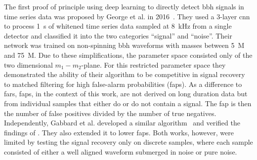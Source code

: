 The first proof of principle using deep learning to directly detect \acrshort{bbh} signals in time series data was proposed by George et al. in 2016~\cite{George:2016hay}. They used a 3-layer \acrshort{cnn} to process \SI{1}{\second} of whitened time series data sampled at \SI{8}{\kilo\hertz} from a single detector and classified it into the two categories ``signal'' and ``noise''. Their network was trained on non-spinning \acrshort{bbh} waveforms with masses between \SI{5}{M_\odot} and \SI{75}{M_\odot}. Due to these simplifications, the parameter space consisted only of the two dimensional $m_1-m_2$-plane. For this restricted parameter space they demonstrated the ability of their algorithm to be competitive in signal recovery to matched filtering for high false-alarm probabilities (\acrshort{fap}s). As a difference to \acrshort{far}s, \acrshort{fap}s, in the context of this work, are not derived on long duration data but from individual samples that either do or do not contain a signal. The \acrshort{fap} is then the number of false positives divided by the number of true negatives. Independently, Gabbard et al. developed a similar algorithm~\cite{Gabbard:2017lja} and verified the findings of \cite{George:2016hay}. They also extended it to lower \acrshort{fap}s. Both works, however, were limited by testing the signal recovery only on discrete samples, where each sample consisted of either a well aligned waveform submerged in noise or pure noise.

